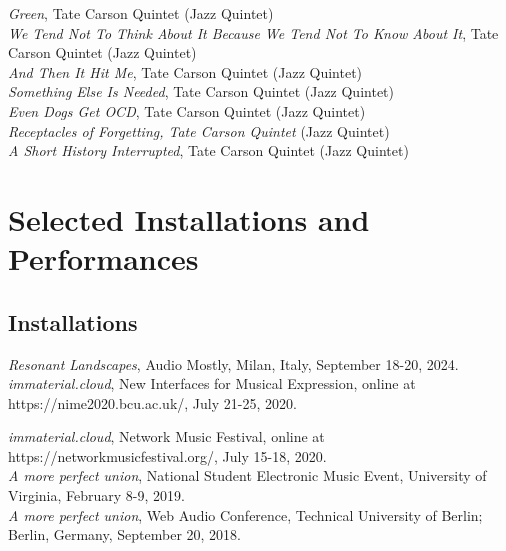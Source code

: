 \documentclass[12pt, a4paper]{article}
\newcommand{\years}[1]{\marginnote{\scriptsize #1}}
\begin{document}
\textit{Green}, Tate Carson Quintet (Jazz Quintet)\\
\textit{We Tend Not To Think About It Because We Tend Not To Know About It}, Tate Carson Quintet (Jazz Quintet)\\
\textit{And Then It Hit Me}, Tate Carson Quintet (Jazz Quintet)\\
\textit{Something Else Is Needed}, Tate Carson Quintet (Jazz Quintet)\\
\textit{Even Dogs Get OCD}, Tate Carson Quintet (Jazz Quintet)\\
\textit{Receptacles of Forgetting, Tate Carson Quintet} (Jazz Quintet)\\
\textit{A Short History Interrupted}, Tate Carson Quintet (Jazz Quintet)

\section*{Selected Installations and Performances}

\subsection*{Installations}
\years{2024} \textit{Resonant Landscapes}, Audio Mostly, Milan, Italy, September 18-20, 2024.\\  
\years{2020}\textit{immaterial.cloud}, New Interfaces for Musical Expression, online at https://nime2020.bcu.ac.uk/, July 21-25, 2020. 

\pagebreak

\textit{immaterial.cloud}, Network Music Festival, online at https://networkmusicfestival.org/, July 15-18, 2020.\\
\years{2019} \textit{A more perfect union}, National Student Electronic Music Event, University of Virginia, February 8-9, 2019.\\  
\years{2018} \textit{A more perfect union}, Web Audio Conference, Technical University of Berlin; Berlin, Germany, September 20, 2018.
\end{document}
